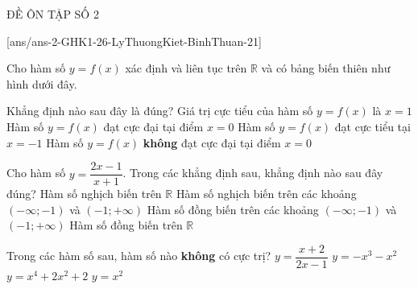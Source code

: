 \begin{name}
	{\tenchude}
	{\tendethi}
	{ĐỀ ÔN TẬP SỐ 2}
	{\thoigian}
\end{name}
	\setcounter{ex}{0}\setcounter{bt}{0}
	[ans/ans-2-GHK1-26-LyThuongKiet-BinhThuan-21]
\begin{ex}%
Cho hàm số $y=f(x)$ xác định và liên tục trên $\mathbb{R}$ và có bảng biến thiên như hình dưới đây.
\begin{center}
\end{center}
 Khẳng định nào sau đây là đúng?
\choice
{Giá trị cực tiểu của hàm số $y=f(x)$ là $x=1$}
{\True Hàm số $y=f(x)$ đạt cực đại tại điểm $x=0$}
{Hàm số $y=f(x)$ đạt cực tiểu tại $x=-1$}
{Hàm số $y=f(x)$ {\bf không} đạt cực đại tại điểm $x=0$}
\end{ex}
\begin{ex}%
Cho hàm số $y=\dfrac{2x-1}{x+1}$. Trong các khẳng định sau, khẳng định nào sau đây đúng?
\choice
{Hàm số nghịch biến trên $\mathbb{R}$}
{Hàm số nghịch biến trên các khoảng $(-\infty; -1)$ và $(-1;+\infty)$}
{\True Hàm số đồng biến trên các khoảng $(-\infty; -1)$ và $(-1;+\infty)$}
{Hàm số đồng biến trên $\mathbb{R}$}
\end{ex}
\begin{ex}%
Trong các hàm số sau, hàm số nào {\bf không} có cực trị?
\choice
{\True $y=\dfrac{x+2}{2x-1}$}
{$y=-x^3-x^2$}
{$y=x^4+2x^2+2$}
{$y=x^2$}
\end{ex}
